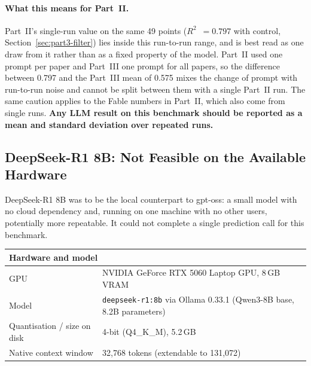 \documentclass[11pt]{article}
\newcommand{\R}{$R^2$}
\begin{document}
\paragraph{What this means for Part~II.} Part~II's single-run value on the same 49
points (\R{}~$=0.797$ with control, Section~\ref{sec:part3-filter}) lies inside this
run-to-run range, and is best read as one draw from it rather than as a fixed property
of the model. Part~II used one prompt per paper and Part~III one prompt for all papers,
so the difference between 0.797 and the Part~III mean of 0.575 mixes the change of
prompt with run-to-run noise and cannot be split between them with a single Part~II run.
The same caution applies to the Fable numbers in Part~II, which also come from single
runs. \textbf{Any LLM result on this benchmark should be reported as a mean and standard
deviation over repeated runs.}

\subsection{DeepSeek-R1 8B: Not Feasible on the Available Hardware}
\label{sec:part3-deepseek}
DeepSeek-R1 8B was to be the local counterpart to gpt-oss: a small model with no
cloud dependency and, running on one machine with no other users, potentially more
repeatable. It could not complete a single prediction call for this benchmark.

\begin{center}\small
\begin{tabular}{ll}
\toprule
\multicolumn{2}{l}{\textbf{Hardware and model}} \\
\midrule
GPU & NVIDIA GeForce RTX 5060 Laptop GPU, 8\,GB VRAM \\
Model & \texttt{deepseek-r1:8b} via Ollama 0.33.1 (Qwen3-8B base, 8.2B parameters) \\
Quantisation / size on disk & 4-bit (Q4\_K\_M), 5.2\,GB \\
Native context window & 32{,}768 tokens (extendable to 131{,}072) \\
\bottomrule
\end{tabular}
\end{center}
\end{document}
